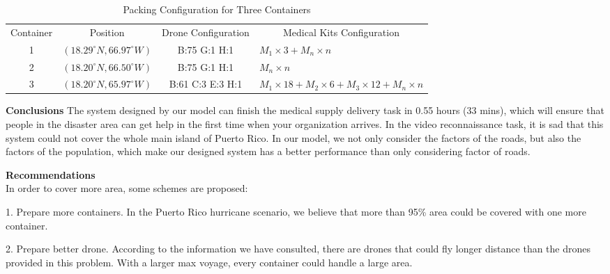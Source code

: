 \documentclass{mcmthesis}
\begin{document}
\begin{table}[H]
	\centering
	
	\begin{tabular}{llll}
		\cline{1-4}
		
		\multicolumn{1}{c}{Container}  & \multicolumn{1}{c}{Position} & \multicolumn{1}{c}{Drone Configuration} & \multicolumn{1}{c}{Medical Kits Configuration} \\ 
		\cline{1-4}
		
		\multicolumn{1}{c}{1} & \multicolumn{1}{c}{$(18.29^\circ N, 66.97^\circ W)$} & \multicolumn{1}{c}{B:75 G:1 H:1}    &  $M_1\times3+M_n\times n$     \\
		\multicolumn{1}{c}{2} & \multicolumn{1}{c}{$(18.20^\circ N, 66.50^\circ W)$} & \multicolumn{1}{c}{B:75 G:1 H:1}   &   $M_n \times n$      \\
		\multicolumn{1}{c}{3} & \multicolumn{1}{c}{$(18.20^\circ N, 65.97^\circ W)$}  &\multicolumn{1}{c}{B:61 C:3 E:3 H:1}   &  $M_1\times 18+M_2\times 6 +M_3 \times 12 +M_n\times n$ \\ 
		
		\cline{1-4}
		
	\end{tabular}
	\caption{Packing Configuration for Three Containers}

\end{table}

\textbf{Conclusions}
The system designed by our model can finish the medical supply delivery task in 0.55 hours (33 mins), which will ensure that people in the disaster area can get help in the first time when your organization arrives.
In the video reconnaissance task, it is sad that this system could not cover the whole main island of Puerto Rico. In our model, we not only consider the factors of the roads, but also the factors of the population, which make our designed system has a better performance than only considering factor of roads.

\textbf{Recommendations } \\
In order to cover more area, some schemes are proposed: 

1.	Prepare more containers. In the Puerto Rico hurricane scenario, we believe that more than 95\% area could be covered with one more container.
 
2.	Prepare better drone. According to the information we have consulted, there are drones that could fly longer distance than the drones provided in this problem. With a larger max voyage, every container could handle a large area.
\end{document}
